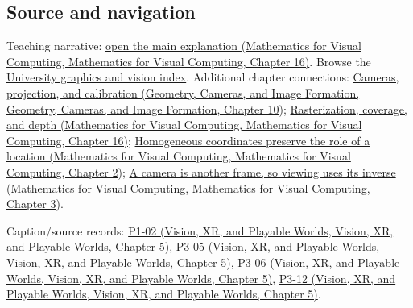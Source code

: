 \subsection{Source and navigation}\label{appendix-40426e4b2103-source-and-navigation}

Teaching narrative: \href{../02-Mathematics-for-Visual-Computing/main.pdf\#nameddest=03-visual-computing-i-ch012-rasterization-coverage-and-depth}{open the main explanation (Mathematics for Visual Computing, Mathematics for Visual Computing, Chapter 16)}. Browse the \hyperref[appendix-a6d556a4ef50-university-graphics-vision-and-photography---independent-series]{University graphics and vision index}. Additional chapter connections: \href{../03-Geometry-Cameras-and-Image-Formation/main.pdf\#nameddest=03-visual-computing-i-ch003-cameras-projection-and-calibration}{Cameras, projection, and calibration (Geometry, Cameras, and Image Formation, Geometry, Cameras, and Image Formation, Chapter 10)}; \href{../02-Mathematics-for-Visual-Computing/main.pdf\#nameddest=03-visual-computing-i-ch012-rasterization-coverage-and-depth}{Rasterization, coverage, and depth (Mathematics for Visual Computing, Mathematics for Visual Computing, Chapter 16)}; \href{../02-Mathematics-for-Visual-Computing/main.pdf\#nameddest=01-foundations-i-ch018-homogeneous-coordinates-preserve-the-role-of-a-location}{Homogeneous coordinates preserve the role of a location (Mathematics for Visual Computing, Mathematics for Visual Computing, Chapter 2)}; \href{../02-Mathematics-for-Visual-Computing/main.pdf\#nameddest=01-foundations-i-ch019-a-camera-is-another-frame-so-viewing-uses-its-inverse}{A camera is another frame, so viewing uses its inverse (Mathematics for Visual Computing, Mathematics for Visual Computing, Chapter 3)}.

Caption/source records: \href{../07-Vision-XR-and-Playable-Worlds/main.pdf\#nameddest=04-visual-computing-ii-ch036-p1-02---module-1.2-course-intro-administrivia-part-2-graphics-visual-computing-2026}{P1-02 (Vision, XR, and Playable Worlds, Vision, XR, and Playable Worlds, Chapter 5)}, \href{../07-Vision-XR-and-Playable-Worlds/main.pdf\#nameddest=04-visual-computing-ii-ch036-p3-05---the-camera-transform}{P3-05 (Vision, XR, and Playable Worlds, Vision, XR, and Playable Worlds, Chapter 5)}, \href{../07-Vision-XR-and-Playable-Worlds/main.pdf\#nameddest=04-visual-computing-ii-ch036-p3-06---clipping}{P3-06 (Vision, XR, and Playable Worlds, Vision, XR, and Playable Worlds, Chapter 5)}, \href{../07-Vision-XR-and-Playable-Worlds/main.pdf\#nameddest=04-visual-computing-ii-ch036-p3-12---scan-conversion}{P3-12 (Vision, XR, and Playable Worlds, Vision, XR, and Playable Worlds, Chapter 5)}.

